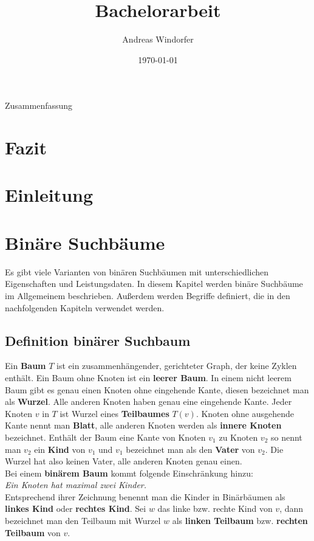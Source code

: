 \documentclass[a4paper,12pt]{article}
\title{Bachelorarbeit}
\author{

	Andreas Windorfer\\
}
\date{\today}
\begin{document}
\maketitle
\newpage
Zusammenfassung
\newpage
\tableofcontents


\newpage

\section{Fazit}
\newpage
\section{Einleitung}
\newpage
\section {Binäre Suchbäume}
Es gibt viele Varianten von binären Suchbäumen mit unterschiedlichen Eigenschaften und Leistungsdaten. In diesem Kapitel werden binäre Suchbäume im Allgemeinem beschrieben. Außerdem werden Begriffe definiert, die in den nachfolgenden Kapiteln verwendet werden. \\
\subsection{Definition binärer Suchbaum}
Ein \textbf{Baum} $T$ ist ein zusammenhängender, gerichteter Graph, der keine Zyklen enthält. Ein Baum ohne Knoten ist ein \textbf{leerer Baum}. In einem nicht leerem Baum gibt es genau einen Knoten ohne eingehende Kante, diesen bezeichnet man als \textbf{Wurzel}. Alle anderen Knoten haben genau eine eingehende Kante. Jeder Knoten $v$ in $T$ ist Wurzel eines \textbf{Teilbaumes} $T(v)$. Knoten ohne ausgehende Kante nennt man \textbf{Blatt}, alle anderen Knoten werden als \textbf{innere Knoten} bezeichnet. Enthält der Baum eine Kante von Knoten $v_1$ zu Knoten $v_2$ so nennt man $v_2$ ein \textbf{Kind} von $v_1$ und $v_1$ bezeichnet man als den  \textbf{Vater} von $v_2$. Die Wurzel hat also keinen Vater, alle anderen Knoten genau einen.\\
Bei einem \textbf{binärem Baum} kommt folgende Einschränkung hinzu:  \\
\textit{Ein Knoten hat maximal zwei Kinder.}\\ 
Entsprechend ihrer Zeichnung benennt man die Kinder in Binärbäumen als \textbf{linkes Kind} oder \textbf{rechtes Kind}. Sei $w$ das linke bzw. rechte Kind von $v$, dann bezeichnet man den Teilbaum mit Wurzel $w$ als \textbf{linken Teilbaum} bzw. \textbf{rechten Teilbaum}  von $v$.  
\end{document}
